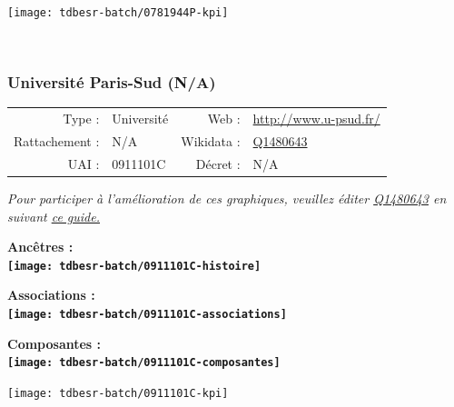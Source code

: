 \documentclass[12pt,french,]{article}
\begin{document}
\begin{center}\texttt{[image: tdbesr-batch/0781944P-kpi]} \end{center}\checkoddpage

\ifoddpage \fi ~\newpage  

\hypertarget{universituxe9-paris-sud-na}{%
\subsubsection{Université Paris-Sud
(N/A)}\label{universituxe9-paris-sud-na}}

\begin{tabular*}{\textwidth}{rp{5cm}rl}  
\hline  
Type : & Université & Web : &\href{http://www.u-psud.fr/}{http://www.u-psud.fr/} \\  
Rattachement : & N/A & Wikidata : & \href{https://www.wikidata.org/entity/Q1480643}{Q1480643} \\  
UAI : & 0911101C & Décret : & N/A \\  
\hline  
\end{tabular*}

\textit{\scriptsize Pour participer à l'amélioration de ces graphiques, veuillez éditer  \href{https://www.wikidata.org/entity/Q1480643}{Q1480643}  en suivant \href{https://github.com/cpesr/wikidataESR/blob/master/Rmd/wikidataESR.md}{ce guide.}}

\vspace{1cm}  
\begin{minipage}[b]{0.50\textwidth}\begin{center} \bf Ancêtres : \\  
\texttt{[image: tdbesr-batch/0911101C-histoire]} \end{center}\end{minipage}\begin{minipage}[b]{0.50\textwidth}\begin{center} \bf Associations : \\  
\texttt{[image: tdbesr-batch/0911101C-associations]} \end{center}\end{minipage}

\hrulefill

\begin{center} \bf Composantes : \\  
\texttt{[image: tdbesr-batch/0911101C-composantes]} \end{center}

\begin{center}\texttt{[image: tdbesr-batch/0911101C-kpi]} \end{center}\checkoddpage
\end{document}
